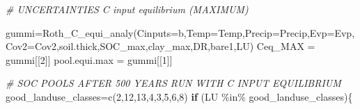 \documentclass[
  10pt,
  b5paper,
]{book}
\newenvironment{Shaded}{\begin{snugshade}}{\end{snugshade}}
\newcommand{\AttributeTok}[1]{\textcolor[rgb]{0.77,0.63,0.00}{#1}}
\newcommand{\CommentTok}[1]{\textcolor[rgb]{0.56,0.35,0.01}{\textit{#1}}}
\newcommand{\ControlFlowTok}[1]{\textcolor[rgb]{0.13,0.29,0.53}{\textbf{#1}}}
\newcommand{\DecValTok}[1]{\textcolor[rgb]{0.00,0.00,0.81}{#1}}
\newcommand{\FunctionTok}[1]{\textcolor[rgb]{0.00,0.00,0.00}{#1}}
\newcommand{\NormalTok}[1]{#1}
\newcommand{\OtherTok}[1]{\textcolor[rgb]{0.56,0.35,0.01}{#1}}
\newcommand{\SpecialCharTok}[1]{\textcolor[rgb]{0.00,0.00,0.00}{#1}}
\begin{document}
\begin{Shaded}
\begin{Highlighting}[]
 \CommentTok{\# UNCERTAINTIES C input equilibrium (MAXIMUM)}
    
\NormalTok{    gummi}\OtherTok{=}\FunctionTok{Roth\_C\_equi\_analy}\NormalTok{(}\AttributeTok{Cinputs=}\NormalTok{b,}\AttributeTok{Temp=}\NormalTok{Temp,}\AttributeTok{Precip=}\NormalTok{Precip,}\AttributeTok{Evp=}\NormalTok{Evp,}\AttributeTok{Cov2=}\NormalTok{Cov2,soil.thick,SOC\_max,clay\_max,DR,bare1,LU)}
\NormalTok{    Ceq\_MAX }\OtherTok{=}\NormalTok{ gummi[[}\DecValTok{2}\NormalTok{]]}
\NormalTok{    pool.equi.max }\OtherTok{=}\NormalTok{ gummi[[}\DecValTok{1}\NormalTok{]]}
  
    \CommentTok{\# SOC POOLS AFTER 500 YEARS RUN WITH C INPUT EQUILIBRIUM}
\NormalTok{    good\_landuse\_classes}\OtherTok{=}\FunctionTok{c}\NormalTok{(}\DecValTok{2}\NormalTok{,}\DecValTok{12}\NormalTok{,}\DecValTok{13}\NormalTok{,}\DecValTok{4}\NormalTok{,}\DecValTok{3}\NormalTok{,}\DecValTok{5}\NormalTok{,}\DecValTok{6}\NormalTok{,}\DecValTok{8}\NormalTok{)}
    \ControlFlowTok{if}\NormalTok{ (LU }\SpecialCharTok{\%in\%}\NormalTok{ good\_landuse\_classes)\{}
     

\end{Highlighting}
\end{Shaded}
\end{document}
